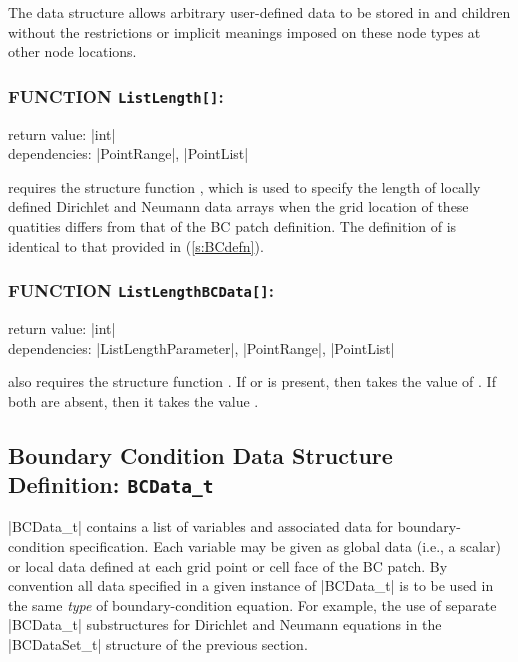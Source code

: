 The  data structure allows arbitrary
user-defined data to be stored in  and
 children without the restrictions or implicit
meanings imposed on these node types at other node locations.

\subsubsection*{FUNCTION \texttt{ListLength[]}:}

\noindent return value: |int| \\
\noindent dependencies: |PointRange|, |PointList|

 requires the structure function , which is
used to specify the length of locally defined Dirichlet and Neumann data arrays
when the grid location of these quatities differs from that of the BC patch
definition. The definition of  is identical to that provided in
 (\autoref{s:BCdefn}).

\subsubsection*{FUNCTION \texttt{ListLengthBCData[]}:}

\noindent return value: |int| \\
\noindent dependencies: |ListLengthParameter|, |PointRange|, |PointList|

 also requires the structure function
. If  or  is present,
then  takes the value of .  If both are
absent, then it takes the value .

\subsection{Boundary Condition Data Structure Definition: \texttt{BCData\_t}}
\label{s:BCData}

|BCData_t| contains a list of variables and associated data for
boundary-condition specification.
Each variable may be given as global data (i.e., a scalar) or local data
defined at each grid point or cell face of the BC patch.
By convention all data specified in a given instance of |BCData_t| is to
be used in the same \emph{type} of boundary-condition equation.
For example, the use of separate |BCData_t| substructures for Dirichlet
and Neumann equations in the |BCDataSet_t| structure of the previous
section.

